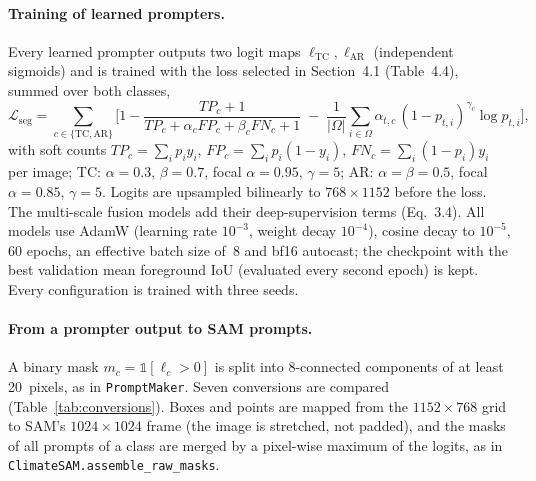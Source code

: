 \paragraph{Training of learned prompters.}
Every learned prompter outputs two logit maps $\ell_{\text{TC}},\ell_{\text{AR}}$ (independent sigmoids) and is
trained with the loss selected in Section~4.1 (Table~4.4), summed over both classes,
\begin{equation}
\mathcal{L}_{\text{seg}}=\sum_{c\in\{\text{TC},\text{AR}\}}\Big[1-\frac{TP_c+1}{TP_c+\alpha_c FP_c+\beta_c FN_c+1}
\;-\;\frac{1}{|\Omega|}\sum_{i\in\Omega}\alpha_{t,c}\,(1-p_{t,i})^{\gamma_c}\log p_{t,i}\Big],
\label{eq:seg_loss}
\end{equation}
with soft counts $TP_c=\sum_i p_i y_i$, $FP_c=\sum_i p_i(1-y_i)$, $FN_c=\sum_i(1-p_i)y_i$ per image;
TC: $\alpha=0.3$, $\beta=0.7$, focal $\alpha=0.95$, $\gamma=5$; AR: $\alpha=\beta=0.5$, focal $\alpha=0.85$,
$\gamma=5$. Logits are upsampled bilinearly to $768\times1152$ before the loss. The multi-scale fusion models add their
deep-supervision terms (Eq.~3.4). All models use AdamW (learning rate $10^{-3}$, weight decay $10^{-4}$), cosine decay
to $10^{-5}$, 60 epochs, an effective batch size of~8 and bf16 autocast; the checkpoint with the best validation mean
foreground IoU (evaluated every second epoch) is kept. Every configuration is trained with three seeds.

\paragraph{From a prompter output to SAM prompts.}
A binary mask $m_c=\mathbb{1}[\ell_c>0]$ is split into 8-connected components of at least 20~pixels, as in
\texttt{PromptMaker}. Seven conversions are compared (Table~\ref{tab:conversions}). Boxes and points are mapped from the
$1152\times768$ grid to SAM's $1024\times1024$ frame (the image is stretched, not padded), and the masks of all prompts
of a class are merged by a pixel-wise maximum of the logits, as in \texttt{ClimateSAM.\allowbreak assemble\_\allowbreak raw\_\allowbreak masks}.


